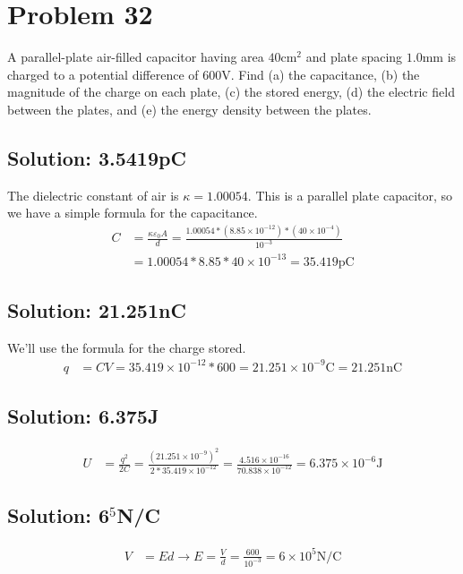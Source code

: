 \documentclass[12pt]{article}
\begin{document}
\pagebreak
\section{Problem 32}
A parallel-plate air-filled capacitor having area $40\unit{\centi\meter^2}$ and plate spacing $1.0 \unit{\milli\meter}$ is charged to a potential difference of $600 \unit{\volt}$. 
Find (a) the capacitance, (b) the magnitude of the charge on each plate, (c) the stored energy, (d) the electric field between the plates, and (e) the energy density between the plates.

\subsection{Solution: 3.5419pC}
The dielectric constant of air is $\kappa = 1.00054$.
This is a parallel plate capacitor, so we have a simple formula for the capacitance. 
\begin{align*}
    C   &=  \frac{\kappa\varepsilon_0 A}{d}
        =   \frac{1.00054*(8.85 \times 10^{-12})*(40 \times 10^{-4})}{10^{-3}}\\
        &=  1.00054 * 8.85 * 40 \times 10^{-13}
        =   \boxed{35.419 \unit{\pico\coulomb}}
\end{align*}

\subsection{Solution: 21.251nC}
We'll use the formula for the charge stored. 
\begin{align*}
    q   &=  CV
        =   35.419 \times 10^{-12} * 600
        =   21.251 \times 10^{-9} \unit{\coulomb}
        =   \boxed{21.251 \unit{\nano\coulomb}}
\end{align*}

\subsection{Solution: 6.375\textmu J}
\begin{align*}
    U   &=  \frac{q^2}{2C}
        =   \frac{(21.251 \times 10^{-9})^2}{2*35.419 \times 10^{-12}}
        =   \frac{4.516 \times 10^{-16}}{70.838 \times 10^{-12}}
        =   \boxed{6.375 \times 10^{-6} \unit{\joule}}
\end{align*}

\subsection{Solution: 6$^5$N/C}
\begin{align*}
    V   &=  Ed \rightarrow
    E   =   \frac{V}{d}
        =   \frac{600}{10^{-3}}
        =   \boxed{6 \times 10^5 \unit{\newton/\coulomb}}
\end{align*}
\end{document}
